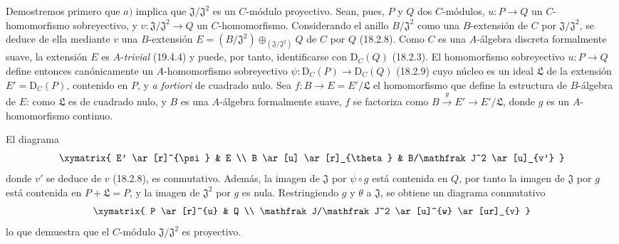 \begin{env}[19.5.4.1]
\label{0.19.5.4.1-fr}
Demostremos primero que $a)$ implica que $\mathfrak J/\mathfrak J^2$ es un
$C$-módulo proyectivo. Sean, pues, $P$ y $Q$ dos $C$-módulos,
$u:P\to Q$ un $C$-homomorfismo sobreyectivo, y
$v:\mathfrak J/\mathfrak J^2\to Q$ un $C$-homomorfismo. Considerando el anillo
$B/\mathfrak J^2$ como una $B$-extensión de $C$ por
$\mathfrak J/\mathfrak J^2$, se deduce de ella mediante $v$ una $B$-extensión
$E=(B/\mathfrak J^2)\oplus_{(\mathfrak J/\mathfrak J^2)}Q$ de $C$ por $Q$
(18.2.8). Como $C$ es una $A$-álgebra discreta formalmente suave,
la extensión $E$ es $A$-\emph{trivial} (19.4.4) y puede, por tanto, identificarse con
$\mathrm D_C(Q)$ (18.2.3). El homomorfismo sobreyectivo $u:P\to Q$ define entonces
canónicamente un $A$-homomorfismo sobreyectivo
$\psi:\mathrm D_C(P)\to\mathrm D_C(Q)$ (18.2.9) cuyo núcleo es un ideal
$\mathfrak L$ de la extensión $E'=\mathrm D_C(P)$, contenido en $P$, y
\emph{a fortiori} de cuadrado nulo. Sea $f:B\to E=E'/\mathfrak L$
el homomorfismo que define la estructura de $B$-álgebra de $E$: como
$\mathfrak L$ es de cuadrado nulo, y $B$ es una $A$-álgebra 
formalmente
suave, $f$ se factoriza como $B\xrightarrow{g}E'\to E'/\mathfrak L$, donde $g$ es
un $A$-homomorfismo continuo.



El diagrama
\[
  \xymatrix{
    E' \ar[r]^{\psi} & E \\
    B \ar[u] \ar[r]_{\theta} & B/\mathfrak J^2 \ar[u]_{v'}
  }
\]
donde $v'$ se deduce de $v$ (18.2.8), es conmutativo. Además, la imagen de
$\mathfrak J$ por $\psi\circ g$ está contenida en $Q$, por tanto la imagen de
$\mathfrak J$ por $g$ está contenida en $P+\mathfrak L=P$, y la imagen de
$\mathfrak J^2$ por $g$ es nula. Restringiendo $g$ y $\theta$ a
$\mathfrak J$, se obtiene un diagrama conmutativo
\[
  \xymatrix{
    P \ar[r]^{u} & Q \\
    \mathfrak J/\mathfrak J^2 \ar[u]^{w} \ar[ur]_{v}
  }
\]
lo que demuestra que el $C$-módulo $\mathfrak J/\mathfrak J^2$ es proyectivo.
\end{env}

